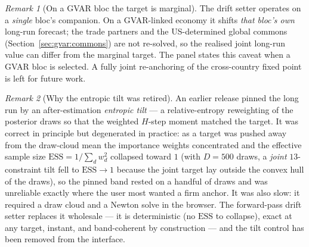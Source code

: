 \documentclass[11pt]{article}
\theoremstyle{definition}
\theoremstyle{remark}
\newtheorem{remark}{Remark}
\begin{document}
\begin{remark}[On a GVAR bloc the target is marginal]
\label{rem:drift_gvar}
The drift setter operates on a \emph{single} bloc's companion. On a
GVAR-linked economy it shifts \emph{that bloc's own} long-run forecast;
the trade partners and the US-determined global commons
(Section~\ref{sec:gvar:commons}) are not re-solved, so the realised
joint long-run value can differ from the marginal target. The panel
states this caveat when a GVAR bloc is selected. A fully joint
re-anchoring of the cross-country fixed point is left for future work.
\end{remark}

\begin{remark}[Why the entropic tilt was retired]
\label{rem:tilt_retired}
An earlier release pinned the long run by an after-estimation
\emph{entropic tilt} --- a relative-entropy reweighting of the posterior
draws \citep{RobertsonTallmanWhiteman2005} so that the weighted
$H$-step moment matched the target. It was correct in principle but
degenerated in practice: as a target was pushed away from the draw-cloud
mean the importance weights concentrated and the effective sample size
$\mathrm{ESS} = 1/\sum_d w_d^2$ collapsed toward $1$ (with $D=500$ draws,
a \emph{joint} $13$-constraint tilt fell to $\mathrm{ESS}\to 1$ because
the joint target lay outside the convex hull of the draws), so the pinned
band rested on a handful of draws and was unreliable exactly where the
user most wanted a firm anchor. It was also slow: it required a draw
cloud and a Newton solve in the browser. The forward-pass drift setter
replaces it wholesale --- it is deterministic (no $\mathrm{ESS}$ to
collapse), exact at any target, instant, and band-coherent by
construction --- and the tilt control has been removed from the
interface.
\end{remark}
\end{document}
